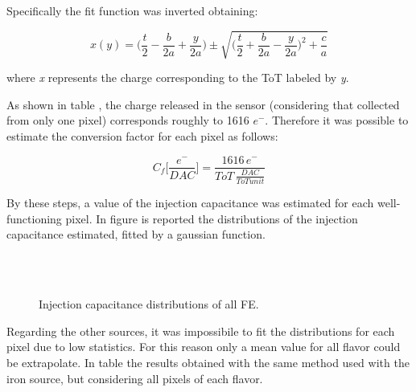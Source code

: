 Specifically the fit function  was inverted obtaining:

\begin{equation}
x(y) = \bigg(\frac{t}{2} - \frac{b}{2a} + \frac{y}{2a}\bigg) \pm \sqrt{\bigg(\frac{t}{2} + \frac{b}{2a} - \frac{y}{2a}\bigg)^{2} + \frac{c}{a}}
\end{equation}

where \textit{x} represents the charge corresponding to the ToT labeled by \textit{y}.

As shown in table , the charge released in the sensor (considering that collected from only one pixel) corresponds roughly to 1616 $e^{-}$. Therefore it was possible to estimate the conversion factor for each pixel as follows:

\begin{equation}
C_{f}\bigg[\frac{e^{-}}{DAC}\bigg] = \frac{1616 \, e^{-}}{ToT \, \frac{DAC}{ToT unit}}
\label{inj_cap}
\end{equation} 

By these steps, a value of the injection capacitance was estimated for each well-functioning pixel. In figure  is reported the distributions of the injection capacitance estimated, fitted by a gaussian function.

\begin{figure}
\centering
{}\quad
{}\\
\quad
{}\\
\caption{Injection capacitance distributions of all FE.}
\label{fig:cap_dist}
\end{figure} 

Regarding the other sources, it was impossibile to fit the distributions for each pixel due to low statistics. For this reason only a mean value for all flavor could be extrapolate. In table  the results obtained with the same method used with the iron source, but considering all pixels of each flavor.


